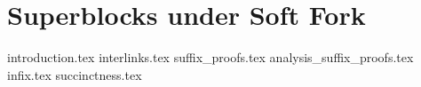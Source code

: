 \chapter{Superblocks under Soft Fork}

{introduction.tex} 
{interlinks.tex} 
{suffix_proofs.tex}
{analysis_suffix_proofs.tex}
{infix.tex}
{succinctness.tex}
